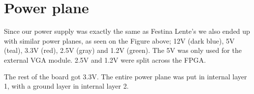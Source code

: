 \section {Power plane}



Since our power supply was exactly the same as Festina Lente's we also ended up
with similar power planes, as seen on the Figure  above; 12V (dark blue), 5V (teal), 
3.3V (red), 2.5V (gray) and 1.2V (green). The 5V was only used for the external 
\ac{VGA} module. 2.5V and 1.2V were split across the \ac{FPGA}.

The rest of the board got 3.3V. The entire power plane was put in internal layer
1, with a ground layer in internal layer 2.
